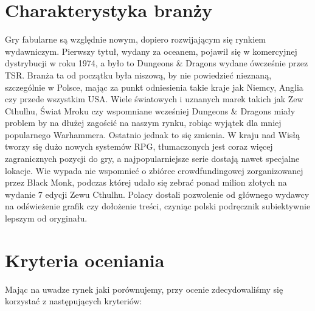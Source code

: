 \documentclass[a4paper,11pt]{article}
\begin{document}
\setcounter{page}{2}


\section {Charakterystyka branży}

Gry fabularne są względnie nowym, dopiero rozwijającym się rynkiem wydawniczym. Pierwszy tytuł, wydany za oceanem, pojawił się w komercyjnej dystrybucji w roku 1974, a było to Dungeons \& Dragons wydane ówcześnie przez TSR. Branża ta od początku była niszową, by nie powiedzieć nieznaną, szczególnie w Polsce, mając za punkt odniesienia takie kraje jak Niemcy, Anglia czy przede wszystkim USA. Wiele światowych i uznanych marek takich jak Zew Cthulhu, Świat Mroku czy wspomniane wcześniej Dungeons \& Dragons miały problem by na dłużej zagościć na naszym rynku, robiąc wyjątek dla mniej popularnego Warhammera. Ostatnio jednak to się zmienia. W kraju nad Wisłą tworzy się dużo nowych systemów RPG, tłumaczonych jest coraz więcej zagranicznych pozycji do gry, a najpopularniejsze serie dostają nawet specjalne lokacje. Wie wypada nie wspomnieć o zbiórce crowdfundingowej zorganizowanej przez Black Monk, podczas której udało się zebrać ponad milion złotych na wydanie 7 edycji Zewu Cthulhu. Polacy dostali pozwolenie od głównego wydawcy na odświeżenie grafik czy dołożenie treści, czyniąc polski podręcznik subiektywnie lepszym od oryginału.


\section {Kryteria oceniania}

Mając na uwadze rynek jaki porównujemy, przy ocenie zdecydowaliśmy się korzystać z następujących kryteriów:
\end{document}

